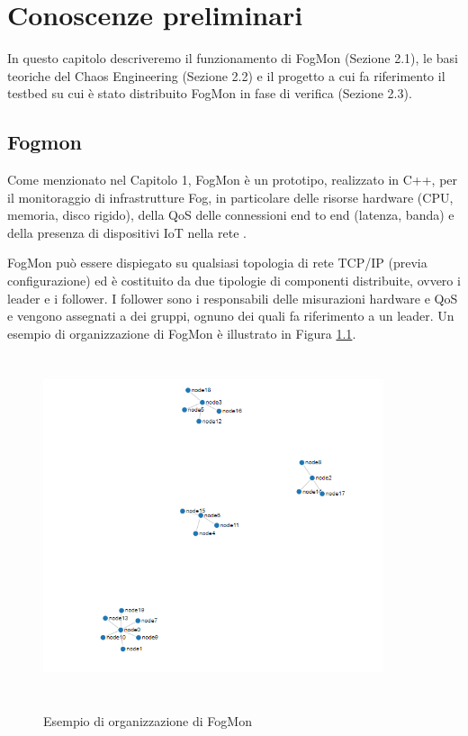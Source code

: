 \chapter{Conoscenze preliminari}
In questo capitolo descriveremo il funzionamento di FogMon (Sezione 2.1), le basi teoriche del Chaos Engineering (Sezione 2.2) e il progetto a cui fa riferimento il testbed su cui è stato distribuito FogMon in fase di verifica (Sezione 2.3).
    
    
    \section{Fogmon}
    Come menzionato nel Capitolo 1, FogMon è un prototipo, realizzato in C++, per il monitoraggio di infrastrutture Fog, in particolare delle risorse hardware (CPU, memoria, disco rigido), della QoS delle connessioni end to end (latenza, banda) e della presenza di dispositivi IoT nella rete \cite{FogMon}.
    
    
    FogMon può essere dispiegato su qualsiasi topologia di rete TCP/IP (previa configurazione) ed è costituito da due tipologie di componenti distribuite, ovvero i leader e i follower. I follower sono i responsabili delle misurazioni hardware e QoS e vengono assegnati a dei gruppi, ognuno dei quali fa riferimento a un leader. Un esempio di organizzazione di FogMon è illustrato in Figura \ref {fig:fogmon1}.
    
    \begin{figure}
        \begin{center}
            \includegraphics[width=10cm, height=10cm]{images/fogmon.PNG}
            \label {fig:fogmon1}
            \caption {Esempio di organizzazione di FogMon}
        \end{center}
    \end {figure}
    
